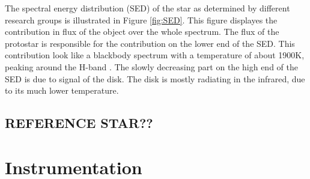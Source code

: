 \documentclass[twoside,single]{lion-msc}
\begin{document}
The spectral energy distribution (SED) of the star as determined by different research groups is illustrated in Figure \ref{fig:SED}. This figure displayes the contribution in flux of the object over the whole spectrum. The flux of the protostar is responsible for the contribution on the lower end of the SED. This contribution look like a blackbody spectrum with a temperature of about 1900K, peaking around the H-band \citep{Padgett}. The slowly decreasing part on the high end of the SED is due to signal of the disk. The disk is mostly radiating in the infrared, due to its much lower temperature.

\section{REFERENCE STAR??}

\chapter{Instrumentation}
\end{document}
